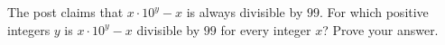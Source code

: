 The post claims that $x\cdot10^y-x$ is always divisible by $99$. For which positive integers $y$ is $x\cdot10^y-x$ divisible by $99$ for every integer $x$? Prove your answer.
